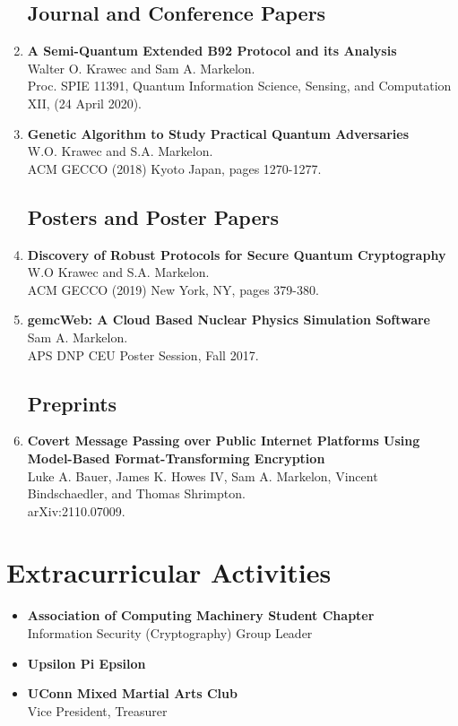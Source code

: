 \documentclass[10pt]{article}
\begin{document}
\begin{enumerate}
  
\subsection*{Journal and Conference Papers}

\item {\bf A Semi-Quantum Extended B92 Protocol and its Analysis}\\
Walter O. Krawec and Sam A. Markelon. \\
Proc. SPIE 11391, Quantum Information Science, Sensing, and Computation XII, (24 April 2020).


\item {\bf Genetic Algorithm to Study Practical Quantum Adversaries}\\
  W.O. Krawec and S.A. Markelon.\\
  ACM GECCO (2018) Kyoto Japan, pages 1270-1277.

\subsection*{Posters and Poster Papers}

\item {\bf Discovery of Robust Protocols for Secure Quantum Cryptography}\\
  W.O Krawec and S.A. Markelon.\\
  ACM GECCO (2019) New York, NY, pages 379-380.

\item {\bf gemcWeb: A Cloud Based Nuclear Physics Simulation Software}\\
  Sam A. Markelon.\\
  APS DNP CEU Poster Session, Fall 2017.

\subsection*{Preprints}

\item {\bf Covert Message Passing over Public Internet Platforms Using Model-Based Format-Transforming Encryption}\\
  Luke A. Bauer, James K. Howes IV, Sam A. Markelon, Vincent Bindschaedler, and Thomas Shrimpton.\\
  arXiv:2110.07009.

\end{enumerate}

\section*{Extracurricular Activities}
\begin{itemize}

\item {\bf Association of Computing Machinery Student Chapter}\\
\quad Information Security (Cryptography) Group Leader

\item {\bf Upsilon Pi Epsilon}

\item {\bf UConn Mixed Martial Arts Club}\\
\quad Vice President, Treasurer

\end{itemize}
\end{document}
